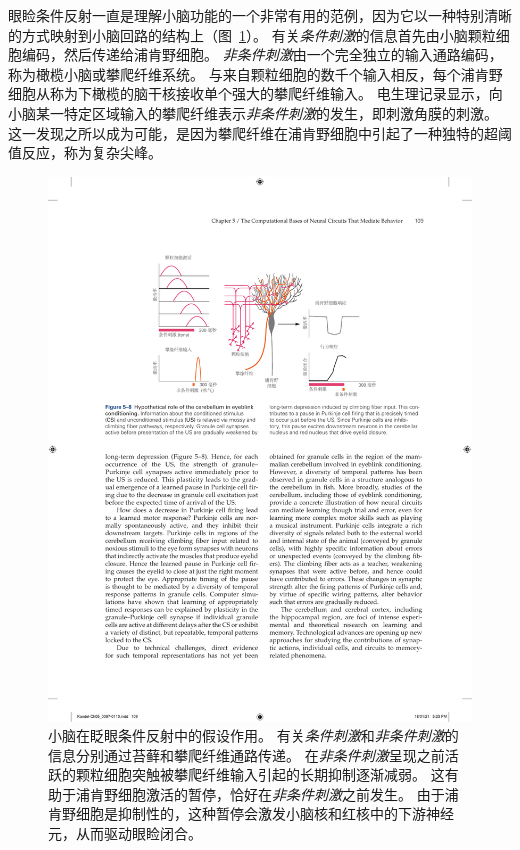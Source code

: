 眼睑条件反射一直是理解小脑功能的一个非常有用的范例，因为它以一种特别清晰的方式映射到小脑回路的结构上（图~\ref{fig:5_8}）。
有关\textit{条件刺激}的信息首先由小脑颗粒细胞编码，然后传递给浦肯野细胞。
\textit{非条件刺激}由一个完全独立的输入通路编码，称为橄榄小脑或攀爬纤维系统。
与来自颗粒细胞的数千个输入相反，每个浦肯野细胞从称为下橄榄的脑干核接收单个强大的攀爬纤维输入。
电生理记录显示，向小脑某一特定区域输入的攀爬纤维表示\textit{非条件刺激}的发生，即刺激角膜的刺激。
这一发现之所以成为可能，是因为攀爬纤维在浦肯野细胞中引起了一种独特的超阈值反应，称为复杂尖峰。


\begin{figure}[htbp]
	\centering
	\includegraphics[width=0.92\linewidth]{chap05/fig_5_8}
	\caption{小脑在眨眼条件反射中的假设作用。
		有关\textit{条件刺激}和\textit{非条件刺激}的信息分别通过苔藓和攀爬纤维通路传递。
		在\textit{非条件刺激}呈现之前活跃的颗粒细胞突触被攀爬纤维输入引起的长期抑制逐渐减弱。
		这有助于浦肯野细胞激活的暂停，恰好在\textit{非条件刺激}之前发生。
		由于浦肯野细胞是抑制性的，这种暂停会激发小脑核和红核中的下游神经元，从而驱动眼睑闭合。}
	\label{fig:5_8}
\end{figure}


